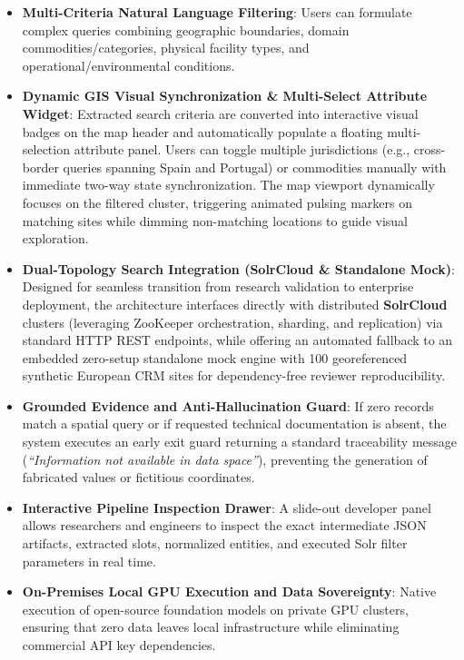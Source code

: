 \begin{itemize}
    \item \textbf{Multi-Criteria Natural Language Filtering}: Users can formulate complex queries combining geographic boundaries, domain commodities/categories, physical facility types, and operational/environmental conditions.
    \item \textbf{Dynamic GIS Visual Synchronization \& Multi-Select Attribute Widget}: Extracted search criteria are converted into interactive visual badges on the map header and automatically populate a floating multi-selection attribute panel. Users can toggle multiple jurisdictions (e.g., cross-border queries spanning Spain and Portugal) or commodities manually with immediate two-way state synchronization. The map viewport dynamically focuses on the filtered cluster, triggering animated pulsing markers on matching sites while dimming non-matching locations to guide visual exploration.
    \item \textbf{Dual-Topology Search Integration (SolrCloud \& Standalone Mock)}: Designed for seamless transition from research validation to enterprise deployment, the architecture interfaces directly with distributed \textbf{SolrCloud} clusters (leveraging ZooKeeper orchestration, sharding, and replication) via standard HTTP REST endpoints, while offering an automated fallback to an embedded zero-setup standalone mock engine with 100 georeferenced synthetic European CRM sites for dependency-free reviewer reproducibility.
    \item \textbf{Grounded Evidence and Anti-Hallucination Guard}: If zero records match a spatial query or if requested technical documentation is absent, the system executes an early exit guard returning a standard traceability message (\textit{``Information not available in data space''}), preventing the generation of fabricated values or fictitious coordinates.
    \item \textbf{Interactive Pipeline Inspection Drawer}: A slide-out developer panel allows researchers and engineers to inspect the exact intermediate JSON artifacts, extracted slots, normalized entities, and executed Solr filter parameters in real time.
    \item \textbf{On-Premises Local GPU Execution and Data Sovereignty}: Native execution of open-source foundation models on private GPU clusters, ensuring that zero data leaves local infrastructure while eliminating commercial API key dependencies.
\end{itemize}

